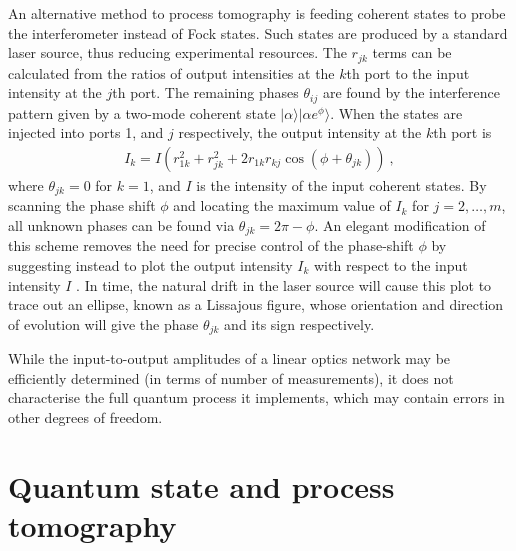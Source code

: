 \documentclass[times,final]{elsarticle}
\newcommand{\ket}[1]{|#1\rangle}
\begin{document}
{An alternative method to process tomography is feeding coherent states to probe the interferometer \cite{bib:Rahimi-Keshari13,bib:Heilmann15} instead of Fock states. Such states are produced by a standard laser source, thus reducing experimental resources. The $r_{jk}$ terms can be calculated from the ratios of output intensities at the $k$th port to the input intensity at the $j$th port. The remaining phases $\theta_{ij}$ are found by the interference pattern given by a two-mode coherent state $\ket{\alpha}\ket{\alpha e^{\phi}}$. When the states are injected into ports 1, and $j$ respectively, the output intensity at the $k$th port is
\begin{align}
I_k=I(r_{1k}^2+r_{jk}^2+2 r_{1k}r_{kj}\cos(\phi+\theta_{jk})) \ ,
\end{align}
where $\theta_{jk}=0$ for $k=1$, and $I$ is the intensity of the input coherent states. By scanning the phase shift $\phi$ and locating the maximum value of $I_k$ for $j=2,\ldots, m$, all unknown phases can be found via $\theta_{jk}=2\pi-\phi$. An elegant modification of this scheme removes the need for precise control of the phase-shift $\phi$ by suggesting instead to plot the output intensity $I_k$ with respect to the input intensity $I$ \cite{bib:Heilmann15}. In time, the natural drift in the laser source will cause this plot to trace out an ellipse, known as a Lissajous figure, whose orientation and direction of evolution will give the phase $\theta_{jk}$ and its sign respectively.

While the input-to-output amplitudes of a linear optics network may be efficiently determined (in terms of number of measurements), it does not characterise the full quantum process it implements, which may contain errors in other degrees of freedom.
}

\section{Quantum state and process tomography}\label{secQPT}
\end{document}
